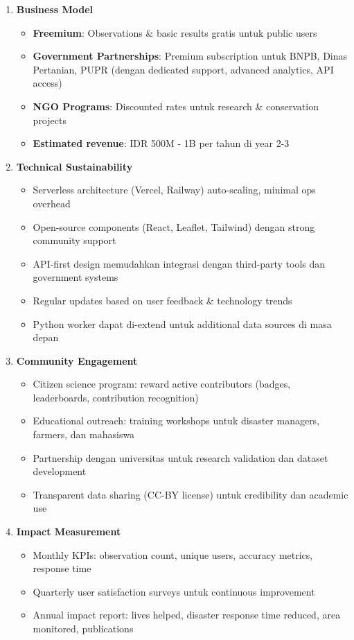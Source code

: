 \documentclass[12pt,a4paper]{article}
\begin{document}
\begin{enumerate}
  \item \textbf{Business Model}
  \begin{itemize}
    \item \textbf{Freemium}: Observations \& basic results gratis untuk public users
    \item \textbf{Government Partnerships}: Premium subscription untuk BNPB, Dinas Pertanian, PUPR (dengan dedicated support, advanced analytics, API access)
    \item \textbf{NGO Programs}: Discounted rates untuk research \& conservation projects
    \item \textbf{Estimated revenue}: IDR 500M - 1B per tahun di year 2-3
  \end{itemize}

  \item \textbf{Technical Sustainability}
  \begin{itemize}
    \item Serverless architecture (Vercel, Railway) auto-scaling, minimal ops overhead
    \item Open-source components (React, Leaflet, Tailwind) dengan strong community support
    \item API-first design memudahkan integrasi dengan third-party tools dan government systems
    \item Regular updates based on user feedback \& technology trends
    \item Python worker dapat di-extend untuk additional data sources di masa depan
  \end{itemize}

  \item \textbf{Community Engagement}
  \begin{itemize}
    \item Citizen science program: reward active contributors (badges, leaderboards, contribution recognition)
    \item Educational outreach: training workshops untuk disaster managers, farmers, dan mahasiswa
    \item Partnership dengan universitas untuk research validation dan dataset development
    \item Transparent data sharing (CC-BY license) untuk credibility dan academic use
  \end{itemize}

  \item \textbf{Impact Measurement}
  \begin{itemize}
    \item Monthly KPIs: observation count, unique users, accuracy metrics, response time
    \item Quarterly user satisfaction surveys untuk continuous improvement
    \item Annual impact report: lives helped, disaster response time reduced, area monitored, publications
  \end{itemize}


\end{enumerate}
\end{document}
